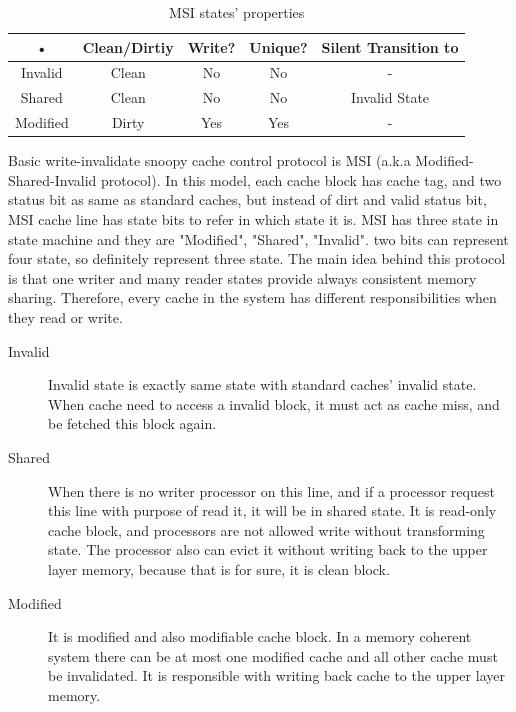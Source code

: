 \begin{table}[position specifier]
\centering
\begin{tabular}{|c|c|c|c|c|}
\hline 
• & Clean/Dirtiy & Write? & Unique? & Silent Transition to \\ 
\hline 
Invalid & Clean & No & No & - \\ 
\hline 
Shared & Clean & No & No & Invalid State \\ 
\hline 
Modified & Dirty & Yes & Yes & - \\ 
\hline 
\end{tabular} 
\caption{MSI states' properties}
\label{tab:MSItable}
\end{table}


Basic write-invalidate snoopy cache control protocol is MSI (a.k.a Modified-Shared-Invalid protocol). In this model, each cache block has cache tag, and two status bit as same as standard caches, but instead of dirt and valid status bit, MSI cache line has state bits to refer in which state it is. MSI has three state in state machine and they are "Modified", "Shared", "Invalid". two bits can represent four state, so definitely represent three state. The main idea behind this protocol is that one writer and many reader states provide always consistent memory sharing. Therefore, every cache in the system has different responsibilities when they read or write.

\begin{description}
\item[Invalid] Invalid state is exactly same state with standard caches' invalid state. When cache need to access a invalid block, it must act as cache miss, and  be fetched this block again.
\item[Shared] When there is no writer processor on this line, and if  a processor request this line with purpose of read it, it will be in shared state.  It is read-only cache block, and processors are not allowed write without transforming state. The processor also can evict it without writing back to the upper layer memory, because that is for sure, it is clean block.
\item[Modified] It is modified and also modifiable cache block. In a memory coherent system there can be at most one modified cache and all other cache must be invalidated. It is responsible with writing back cache to the upper layer memory. 
\end{description}



